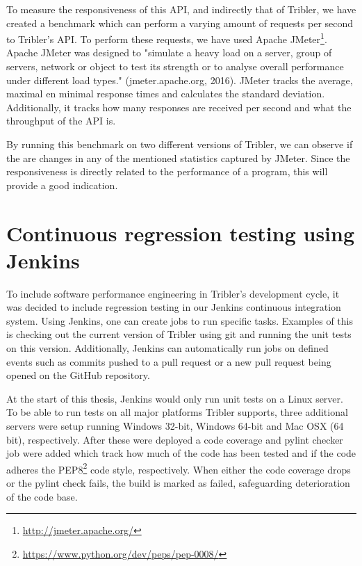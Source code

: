 To measure the responsiveness of this API, and indirectly that of Tribler, we have created a benchmark which can perform a varying amount of requests per second to Tribler's API.
To perform these requests, we have used Apache JMeter\footnote{\url{http://jmeter.apache.org/}}.
Apache JMeter was designed to "simulate a heavy load on a server, group of servers, network or object to test its strength or to analyse overall performance under different load types." (jmeter.apache.org, 2016).
JMeter tracks the average, maximal en minimal response times and calculates the standard deviation.
Additionally, it tracks how many responses are received per second and what the throughput of the API is.

By running this benchmark on two different versions of Tribler, we can observe if the are changes in any of the mentioned statistics captured by JMeter.
Since the responsiveness is directly related to the performance of a program, this will provide a good indication.


\section{Continuous regression testing using Jenkins}



To include software performance engineering in Tribler's development cycle, it was decided to include regression testing in our Jenkins continuous integration system.
Using Jenkins, one can create jobs to run specific tasks.
Examples of this is checking out the current version of Tribler using git and running the unit tests on this version.
Additionally, Jenkins can automatically run jobs on defined events such as commits pushed to a pull request or a new pull request being opened on the GitHub repository.

At the start of this thesis, Jenkins would only run unit tests on a Linux server.
To be able to run tests on all major platforms Tribler supports, three additional servers were setup running Windows 32-bit, Windows 64-bit and Mac OSX (64 bit), respectively.
After these were deployed a code coverage and pylint checker job were added which track how much of the code has been tested and if the code adheres the PEP8\footnote{\url{https://www.python.org/dev/peps/pep-0008/}} code style, respectively.
When either the code coverage drops or the pylint check fails, the build is marked as failed, safeguarding deterioration of the code base.

